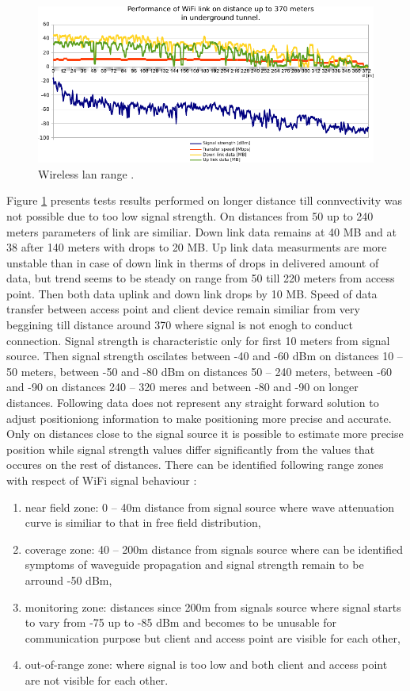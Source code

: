 \documentclass[../main.tex]{subfiles}
\begin{document}
\begin{figure}[ht]
\includegraphics[width=\textwidth]{pictures/wifi_link_long.pdf}
\centering
\caption{Wireless lan range \cite{Thesis_CM}. }
\label{fig:wifi_link_long}
\end{figure}

Figure \ref{fig:wifi_link_long} presents tests results performed on longer distance till connvectivity was not possible due to too low signal strength. On distances from 50 up to 240 meters parameters of link are similiar. Down link data remains at 40 MB and at 38 after 140 meters with drops to 20 MB. Up link data measurments are more unstable than in case of down link in therms of drops in delivered amount of data, but trend seems to be steady on range from 50 till 220 meters from access point. Then both data uplink and down link drops by 10 MB.  Speed of data transfer between access point and client device remain similiar from very beggining till distance around 370 where signal is not enogh to conduct connection. Signal strength is characteristic only for first 10 meters from signal source. Then signal strength oscilates between -40 and -60 dBm on distances 10 -- 50 meters, between -50 and -80 dBm on distances 50 -- 240 meters, between -60 and -90 on distances 240 -- 320 meres and between -80 and -90 on longer distances. Following data does not represent any straight forward solution to adjust positioniong information to make positioning more precise and accurate. Only on distances close to the signal source it is possible to estimate more precise position while signal strength values differ significantly from the values that occures on the rest of distances. There can be identified following range zones with respect of WiFi signal behaviour \cite{Thesis_CM}:
\begin{enumerate}
	\item near field zone: 0 -- 40m distance from signal source where wave attenuation curve is similiar to that in free field distribution,
	\item coverage zone: 40 -- 200m distance from signals source where can be identified symptoms of waveguide propagation and signal strength remain to be arround -50 dBm,
	\item monitoring zone: distances since 200m from signals source where signal starts to vary from -75 up to -85 dBm and becomes to be unusable for communication purpose but client and access point are visible for each other,
	\item out-of-range zone: where signal is too low and both client and access point are not visible for each other.
\end{enumerate}
\end{document}
